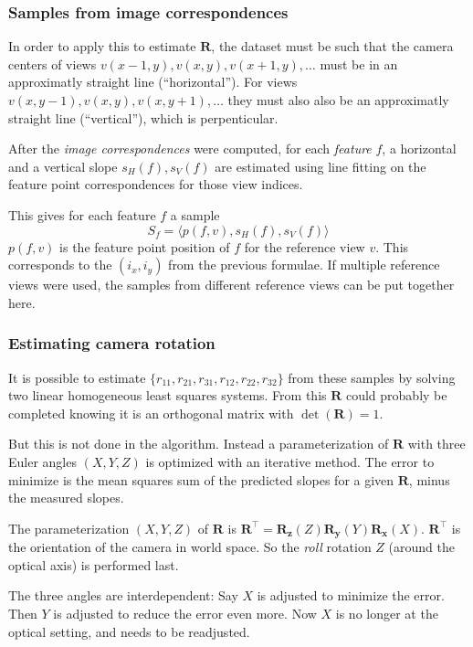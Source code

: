 \documentclass{scrreprt}
\newcommand{\matr}[1]{\mathbf{#1}}
\newcommand{\transpose}[1]{#1^\intercal}
\begin{document}
\subsubsection{Samples from image correspondences}
In order to apply this to estimate $\matr{R}$, the dataset must be such that the camera centers of views $v(x-1,y), v(x,y), v(x+1,y), \dots$ must be in an approximatly straight line (``horizontal''). For views $v(x,y-1), v(x,y), v(x,y+1), \dots$ they must also also be an approximatly straight line (``vertical''), which is perpenticular.

After the \emph{image correspondences} were computed, for each \emph{feature} $f$, a horizontal and a vertical slope $s_H(f), s_V(f)$ are estimated using line fitting on the feature point correspondences for those view indices.

This gives for each feature $f$ a sample
\begin{equation}
S_f = \langle p(f,v), s_H(f), s_V(f) \rangle
\end{equation}
$p(f,v)$ is the feature point position of $f$ for the reference view $v$. This corresponds to the $(i_x, i_y)$ from the previous formulae. If multiple reference views were used, the samples from different reference views can be put together here.


\subsubsection{Estimating camera rotation}
It is possible to estimate $\{r_{11}, r_{21}, r_{31}, r_{12}, r_{22}, r_{32}\}$ from these samples by solving two linear homogeneous least squares systems. From this $\matr{R}$ could probably be completed knowing it is an orthogonal matrix with $\det(\matr{R}) = 1$.

But this is not done in the algorithm. Instead a parameterization of $\matr{R}$ with three Euler angles $(X,Y,Z)$ is optimized with an iterative method. The error to minimize is the mean squares sum of the predicted slopes for a given $\matr{R}$, minus the measured slopes.

The parameterization $(X,Y,Z)$ of $\matr{R}$ is $\transpose{\matr{R}} = \matr{R_z}(Z) \matr{R_y}(Y) \matr{R_x}(X)$. $\transpose{\matr{R}}$ is the orientation of the camera in world space. So the \emph{roll} rotation $Z$ (around the optical axis) is performed last.

The three angles are interdependent: Say $X$ is adjusted to minimize the error. Then $Y$ is adjusted to reduce the error even more. Now $X$ is no longer at the optical setting, and needs to be readjusted.
\end{document}

